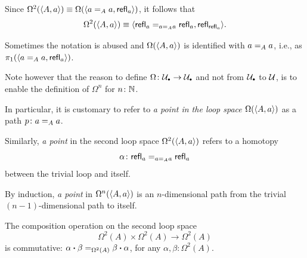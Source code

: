 \begin{rem}
    Since $\Omega^2(\langle A,a\rangle)\equiv\Omega(\langle a\mathrel{=_{A}}a,\mathsf{refl}_a\rangle)$, it follows that
    \[
        \Omega^2(\langle A,a\rangle)
            \equiv
            \langle
                \mathsf{refl}_a\mathrel{=_{a\mathrel{=_{A}}a}}\mathsf{refl}_a,
                \mathsf{refl}_{\mathsf{refl}_a}
            \rangle.
    \]
\end{rem}

\begin{rem}\label{rem:Omega-abuse}
    Sometimes the notation is abused and $\Omega(\langle A,a\rangle)$ is identified with $a\mathrel{=_{A}}a$, i.e., as $\pi_1(\langle a\mathrel{=_{A}}a,\mathsf{refl}_a\rangle)$.

    Note however that the reason to define $\Omega\colon\puniv\to\puniv$ and not from $\puniv$ to $\mathcal U$, is to enable the definition of $\Omega^n$ for $n\colon\N$.

    In particular, it is customary to refer to \textit{a point in the loop space\/ $\Omega(\langle A,a\rangle)$} as a path $p\colon a\eq Aa$.
    
    Similarly, \textit{a point} in the second loop space $\Omega^2(\langle A,a\rangle)$ refers to a homotopy 
    \[
        \alpha\colon\fun{refl}_a\eq{a\eq Aa}\fun{refl}_a
    \]
    between the trivial loop and itself.

    By induction, \textit{a point} in $\Omega^n(\langle A,a\rangle)$ is an $n$-dimensional path from the trivial $(n-1)$-dimensional path to itself.
\end{rem}

\begin{thm} {}
    The composition operation on the second loop space
    \[
        \Omega^2(A)\times\Omega^2(A)\to\Omega^2(A)
    \]
    is commutative: $\alpha\mathbin{\boldsymbol{\cdot}}\beta\mathrel{=_{\Omega^2(A)}}\beta\mathbin{\boldsymbol{\cdot}}\alpha$, for any\/ $\alpha,\beta\colon\Omega^2(A)$.
\end{thm}

